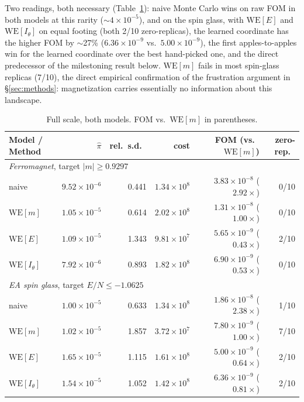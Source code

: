 \documentclass[a4paper,fleqn]{cas-sc}
\begin{document}
Two readings, both necessary (Table~\ref{tab:prefix}): naive Monte Carlo wins on raw FOM in both models at this
rarity ($\sim\!4\times10^{-5}$), and on the spin glass, with $\mathrm{WE}[E]$ and
$\mathrm{WE}[I_\theta]$ on equal footing (both 2/10 zero-replicas), the learned
	coordinate has the higher FOM by $\sim$27\% ($6.36\times10^{-9}$ vs.\ $5.00\times10^{-9}$),
the first apples-to-apples win for the learned coordinate over the best hand-picked
one, and the direct predecessor of the milestoning result below. $\mathrm{WE}[m]$ fails in
most spin-glass replicas (7/10), the direct empirical confirmation of the frustration
argument in \S\ref{sec:methods}: magnetization carries essentially no information about
this landscape.
\begin{table}[H]
\centering\small
\caption{Full scale, both models. FOM vs.\ $\mathrm{WE}[m]$ in parentheses.}
\label{tab:prefix}
\setlength{\tabcolsep}{4pt}
\begin{tabular}{lrrrrr}
	\toprule
	Model / Method & $\hat\pi$ & rel.\ s.d.\ & cost & FOM (vs.\ $\mathrm{WE}[m]$) & zero-rep.\ \\
	\midrule
	\multicolumn{6}{l}{\emph{Ferromagnet}, target $|m|\ge0.9297$} \\
	naive & $9.52\times10^{-6}$ & 0.441 & $1.34\times10^{8}$ & $3.83\times10^{-8}$ ($2.92\times$) & 0/10 \\
	$\mathrm{WE}[m]$ & $1.05\times10^{-5}$ & 0.614 & $2.02\times10^{8}$ & $1.31\times10^{-8}$ ($1.00\times$) & 0/10 \\
	$\mathrm{WE}[E]$ & $1.09\times10^{-5}$ & 1.343 & $9.81\times10^{7}$ & $5.65\times10^{-9}$ ($0.43\times$) & 2/10 \\
	$\mathrm{WE}[I_\theta]$ & $7.92\times10^{-6}$ & 0.893 & $1.82\times10^{8}$ & $6.90\times10^{-9}$ ($0.53\times$) & 0/10 \\
	\multicolumn{6}{l}{\emph{EA spin glass}, target $E/N\le-1.0625$} \\
	naive & $1.00\times10^{-5}$ & 0.633 & $1.34\times10^{8}$ & $1.86\times10^{-8}$ ($2.38\times$) & 1/10 \\
	$\mathrm{WE}[m]$ & $1.02\times10^{-5}$ & 1.857 & $3.72\times10^{7}$ & $7.80\times10^{-9}$ ($1.00\times$) & 7/10 \\
	$\mathrm{WE}[E]$ & $1.65\times10^{-5}$ & 1.115 & $1.61\times10^{8}$ & $5.00\times10^{-9}$ ($0.64\times$) & 2/10 \\
	$\mathrm{WE}[I_\theta]$ & $1.54\times10^{-5}$ & 1.052 & $1.42\times10^{8}$ & $6.36\times10^{-9}$ ($0.81\times$) & 2/10 \\
	\bottomrule
\end{tabular}
\end{table}
\end{document}
